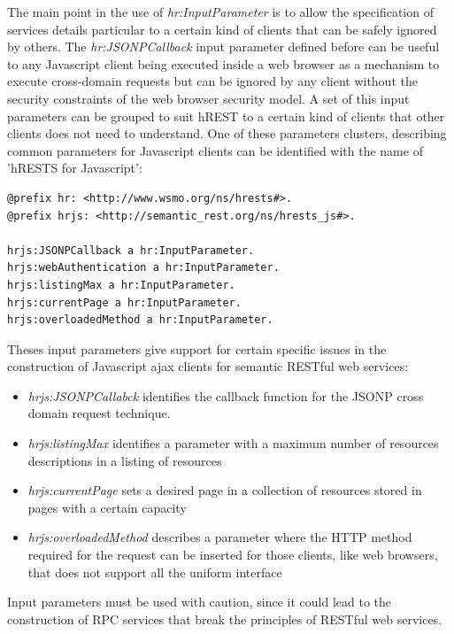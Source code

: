 The main point in the use of \emph{hr:InputParameter} is to allow the specification of services details particular to a certain kind of clients that can be safely ignored by others. The \emph{hr:JSONPCallback} input parameter defined before can be useful to any Javascript client being executed inside a web browser as a mechanism to execute cross-domain requests but can be ignored by any client without the security constraints of the web browser security model. A set of this input parameters can be grouped to suit hREST to a certain kind of clients that other clients does not need to understand. One of these parameters clusters, describing common parameters for Javascript clients can be identified with the name of 'hRESTS for Javascript':
\vspace{5 mm}
\begin{lstlisting}
@prefix hr: <http://www.wsmo.org/ns/hrests#>. 
@prefix hrjs: <http://semantic_rest.org/ns/hrests_js#>. 

hrjs:JSONPCallback a hr:InputParameter.
hrjs:webAuthentication a hr:InputParameter.
hrjs:listingMax a hr:InputParameter.
hrjs:currentPage a hr:InputParameter.
hrjs:overloadedMethod a hr:InputParameter.
\end{lstlisting} \vspace{5 mm}

Theses input parameters give support for certain specific issues in the construction of Javascript ajax clients for semantic RESTful web services:

\begin{itemize}
  \item \emph{hrjs:JSONPCallabck} identifies the callback function for the JSONP cross domain request technique.
  \item \emph{hrjs:listingMax} identifies a parameter with a maximum number of resources descriptions in a listing of resources
  \item \emph{hrjs:currentPage} sets a desired page in a collection of resources stored in pages with a certain capacity
  \item \emph{hrjs:overloadedMethod} describes a parameter where the HTTP method required for the request can be inserted for those clients, like web browsers, that does not support all the uniform interface
\end{itemize}

Input parameters must be used with caution, since it could lead to the construction of RPC services that break the principles of RESTful web services.

